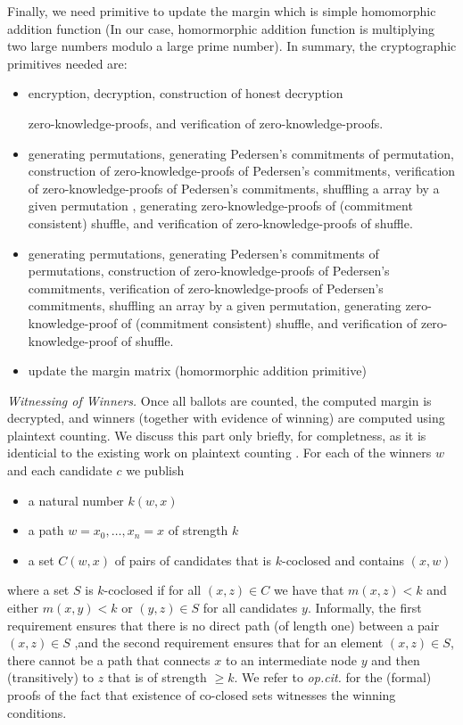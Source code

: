 \documentclass{llncs}
\begin{document}
Finally, we need primitive to update the margin which is simple homomorphic
addition function (In our case, homormorphic 
 addition function is multiplying two large numbers modulo a large prime 
 number).
In summary, the cryptographic primitives needed are: 
\begin{itemize} 
\item encryption, decryption, construction of honest decryption

     zero-knowledge-proofs, and verification of zero-knowledge-proofs. 
\item generating permutations, generating Pedersen's 
     commitments \cite{Pederson} of permutation, construction of 
     zero-knowledge-proofs of Pedersen's commitments, verification of 
     zero-knowledge-proofs of Pedersen's commitments, shuffling a array 
     by a given permutation \cite{Wikstrom:2009:CPS}, 
     generating zero-knowledge-proofs of (commitment consistent) shuffle, 
     and verification of zero-knowledge-proofs of shuffle.

\item generating permutations, generating  Pedersen's 
     commitments of permutations, construction of 
     zero-knowledge-proofs of Pedersen's commitments, verification of 
     zero-knowledge-proofs of Pedersen's commitments, shuffling an array 
     by a given permutation, 
     generating zero-knowledge-proof of (commitment consistent) shuffle, 
     and verification of zero-knowledge-proof of shuffle.
\item  update the margin matrix (homormorphic addition primitive)
\end{itemize}



\smallskip\noindent\emph{Witnessing of Winners.}
Once all ballots are counted, the computed margin is decrypted, and
winners (together with evidence of winning) are computed using 
plaintext counting. We discuss this part only briefly, for completness,
 as it is identicial to the existing work on plaintext counting
\cite{Pattinson:2017:SVE}. For each of the winners $w$ and each
candidate $c$ we publish
\begin{itemize}
\item a natural number $k(w, x)$
\item a path $w = x_0, \dots, x_n = x$ of strength $k$
\item a set $C(w, x)$ of pairs of candidates that is $k$-coclosed
and contains $(x, w)$
\end{itemize}
where a set $S$ is  $k$-coclosed if for all $(x,z) \in C$ we have
that $m(x, z) < k$ and either $m(x, y) < k$ or $(y,z) \in S$ for
all candidates $y$.  Informally, the first requirement ensures that
there is no direct path (of length one) between a pair $(x, z) \in
S$ ,and the second requirement ensures that for an element $(x, z)
\in S$, there cannot be a path that connects $x$ to an intermediate
node $y$ and then (transitively) to $z$ that is of strength $\geq
k$. 
We refer to \emph{op.cit.} for the (formal)
proofs of the fact that existence of co-closed sets witnesses the
winning conditions. 
  
\end{document}
